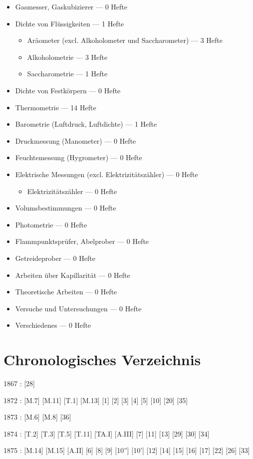 \begin{itemize}
\item Gasmesser, Gaskubizierer --- 0 Hefte
\item Dichte von Flüssigkeiten --- 1 Hefte
\begin{itemize}
\item Aräometer (excl. Alkoholometer und Saccharometer) --- 3 Hefte
\item Alkoholometrie --- 3 Hefte
\item Saccharometrie --- 1 Hefte
\end{itemize}
\item Dichte von Festkörpern --- 0 Hefte
\item Thermometrie --- 14 Hefte
\item Barometrie (Luftdruck, Luftdichte) --- 1 Hefte
\item Druckmessung (Manometer) --- 0 Hefte
\item Feuchtemessung (Hygrometer) --- 0 Hefte
\item Elektrische Messungen (excl. Elektrizitätszähler) --- 0 Hefte
\begin{itemize}
\item Elektrizitätszähler --- 0 Hefte
\end{itemize}
\item Volumsbestimmungen --- 0 Hefte
\item Photometrie --- 0 Hefte
\item Flammpunktsprüfer, Abelprober --- 0 Hefte
\item Getreideprober --- 0 Hefte
\item Arbeiten über Kapillarität --- 0 Hefte
\item Theoretische Arbeiten --- 0 Hefte
\item Versuche und Untersuchungen --- 0 Hefte
\item Verschiedenes --- 0 Hefte
\end{itemize}

\chapter{Chronologisches Verzeichnis}
1867 : [28]

1872 : [M.7] [M.11] [T.1] [M.13] [1] [2] [3] [4] [5] [10] [20] [35]

1873 : [M.6] [M.8] [36]

1874 : [T.2] [T.3] [T.5] [T.11] [TA.I] [A.III] [7] [11] [13] [29] [30] [34]

1875 : [M.14] [M.15] [A.II] [6] [8] [9] [10''] [10'] [12] [14] [15] [16] [17] [22] [26] [33]

